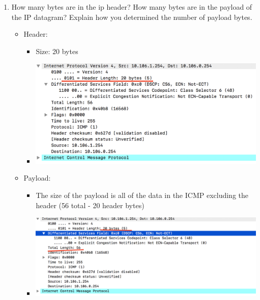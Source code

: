 \documentclass{article}
\begin{document}
\begin{enumerate}
      \item How many bytes are in the ip header?  How many bytes are in the payload of the IP datagram?  Explain how you determined the number of payload bytes.
          \begin{itemize}
            \item Header:
              \begin{itemize}
                \item Size: 20 bytes
                \item \includegraphics[scale=0.5]{images/IP3.png}
              \end{itemize}
            \item Payload:
              \begin{itemize}
                \item The size of the payload is all of the data in the ICMP excluding the header (56 total - 20 header bytes)
                \item \includegraphics[scale=0.5]{images/IP3b.png}
              \end{itemize}
          \end{itemize}


\end{enumerate}
\end{document}
